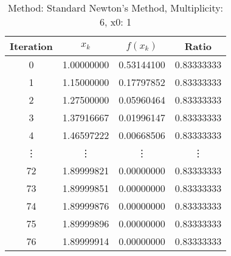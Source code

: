 \begin{table}
\centering
\caption{Method: Standard Newton's Method, Multiplicity: 6, x0: 1}
\label{tab:table_Standard_Newton's_Method_6_1}
\begin{tabular}{c c c c}
\toprule
Iteration &      $x_k$ &   $f(x_k)$ &      Ratio \\
\midrule
        0 & 1.00000000 & 0.53144100 & 0.83333333 \\
        1 & 1.15000000 & 0.17797852 & 0.83333333 \\
        2 & 1.27500000 & 0.05960464 & 0.83333333 \\
        3 & 1.37916667 & 0.01996147 & 0.83333333 \\
        4 & 1.46597222 & 0.00668506 & 0.83333333 \\
   \vdots &     \vdots &     \vdots &     \vdots \\
       72 & 1.89999821 & 0.00000000 & 0.83333333 \\
       73 & 1.89999851 & 0.00000000 & 0.83333333 \\
       74 & 1.89999876 & 0.00000000 & 0.83333333 \\
       75 & 1.89999896 & 0.00000000 & 0.83333333 \\
       76 & 1.89999914 & 0.00000000 & 0.83333333 \\
\bottomrule
\end{tabular}
\end{table}
